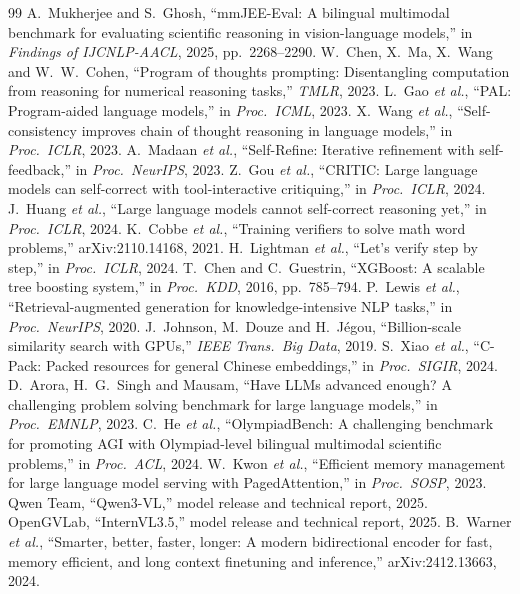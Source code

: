 \documentclass[conference]{IEEEtran}
\begin{document}
\begin{thebibliography}{99}\footnotesize
{} A.~Mukherjee and S.~Ghosh, ``mmJEE-Eval: A bilingual multimodal benchmark for
evaluating scientific reasoning in vision-language models,'' in \emph{Findings of IJCNLP-AACL},
2025, pp.~2268--2290.
 W.~Chen, X.~Ma, X.~Wang and W.~W.~Cohen, ``Program of thoughts prompting:
Disentangling computation from reasoning for numerical reasoning tasks,'' \emph{TMLR}, 2023.
 L.~Gao \emph{et al.}, ``PAL: Program-aided language models,'' in \emph{Proc.\ ICML},
2023.
 X.~Wang \emph{et al.}, ``Self-consistency improves chain of thought
reasoning in language models,'' in \emph{Proc.\ ICLR}, 2023.
 A.~Madaan \emph{et al.}, ``Self-Refine: Iterative refinement with
self-feedback,'' in \emph{Proc.\ NeurIPS}, 2023.
 Z.~Gou \emph{et al.}, ``CRITIC: Large language models can self-correct with
tool-interactive critiquing,'' in \emph{Proc.\ ICLR}, 2024.
 J.~Huang \emph{et al.}, ``Large language models cannot self-correct
reasoning yet,'' in \emph{Proc.\ ICLR}, 2024.
 K.~Cobbe \emph{et al.}, ``Training verifiers to solve math word problems,''
arXiv:2110.14168, 2021.
 H.~Lightman \emph{et al.}, ``Let's verify step by step,'' in \emph{Proc.\
ICLR}, 2024.
 T.~Chen and C.~Guestrin, ``XGBoost: A scalable tree boosting system,'' in
\emph{Proc.\ KDD}, 2016, pp.~785--794.
 P.~Lewis \emph{et al.}, ``Retrieval-augmented generation for knowledge-intensive
NLP tasks,'' in \emph{Proc.\ NeurIPS}, 2020.
 J.~Johnson, M.~Douze and H.~J\'egou, ``Billion-scale similarity search with
GPUs,'' \emph{IEEE Trans.\ Big Data}, 2019.
 S.~Xiao \emph{et al.}, ``C-Pack: Packed resources for general Chinese
embeddings,'' in \emph{Proc.\ SIGIR}, 2024.
 D.~Arora, H.~G.~Singh and Mausam, ``Have LLMs advanced enough? A challenging
problem solving benchmark for large language models,'' in \emph{Proc.\ EMNLP}, 2023.
\bibitem{olympiadbench} C.~He \emph{et al.}, ``OlympiadBench: A challenging benchmark for
promoting AGI with Olympiad-level bilingual multimodal scientific problems,'' in \emph{Proc.\
ACL}, 2024.
\bibitem{vllm} W.~Kwon \emph{et al.}, ``Efficient memory management for large language model
serving with PagedAttention,'' in \emph{Proc.\ SOSP}, 2023.
\bibitem{qwen3vl} Qwen Team, ``Qwen3-VL,'' model release and technical report, 2025.
\bibitem{internvl35} OpenGVLab, ``InternVL3.5,'' model release and technical report, 2025.
\bibitem{modernbert} B.~Warner \emph{et al.}, ``Smarter, better, faster, longer: A modern
bidirectional encoder for fast, memory efficient, and long context finetuning and inference,''
arXiv:2412.13663, 2024.
\end{thebibliography}
\end{document}
